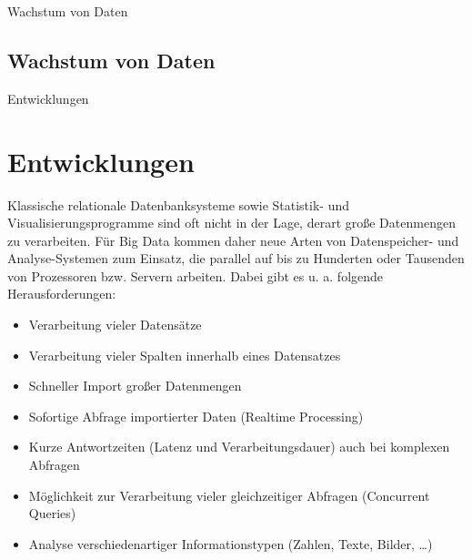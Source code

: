 \documentclass[11pt]{beamer}
\begin{document}
\begin{frame}{Wachstum von Daten}
\subsection{Wachstum von Daten}
	\begin{figure}
	\end{figure}
\end{frame}


\begin{frame}{Entwicklungen}
\section{Entwicklungen}
Klassische relationale Datenbanksysteme sowie Statistik- und Visualisierungsprogramme sind oft nicht in der Lage, derart große Datenmengen zu verarbeiten. Für Big Data kommen daher neue Arten von Datenspeicher- und Analyse-Systemen zum Einsatz, die parallel auf bis zu Hunderten oder Tausenden von Prozessoren bzw. Servern arbeiten. Dabei gibt es u. a. folgende Herausforderungen:
\end{frame}
\begin{frame}
\begin{itemize}
\item Verarbeitung vieler Datensätze
\item Verarbeitung vieler Spalten innerhalb eines Datensatzes
\item Schneller Import großer Datenmengen
\item Sofortige Abfrage importierter Daten (Realtime Processing)
\item Kurze Antwortzeiten (Latenz und Verarbeitungsdauer) auch bei komplexen Abfragen
\item Möglichkeit zur Verarbeitung vieler gleichzeitiger Abfragen (Concurrent Queries)
\item Analyse verschiedenartiger Informationstypen (Zahlen, Texte, Bilder, …)

\end{itemize}

\end{frame}
\end{document}
